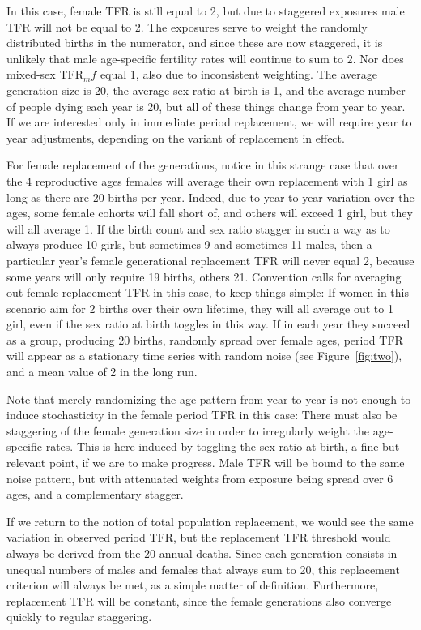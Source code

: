 \documentclass[reqno,12pt,oneside,a4paper]{report} %
\theoremstyle{plain}
\theoremstyle{definition}
\theoremstyle{remark}
\numberwithin{theorem}{chapter}     %
\begin{document}
In this case, female TFR is still equal to 2, but due to staggered exposures male TFR will not be equal to 2. The exposures serve to weight the randomly distributed births in the numerator, and since these are now staggered, it is unlikely that male age-specific fertility rates will continue to sum to 2. Nor does mixed-sex TFR$_mf$ equal 1, also due to inconsistent weighting. The average generation size is 20, the average sex ratio at birth is 1, and the average number of people dying each year is 20, but all of these things change from year to year. If we are interested only in immediate period replacement, we will require year to year adjustments, depending on the variant of replacement in effect.

For female replacement of the generations, notice in this strange case that over the 4 reproductive ages females will average their own replacement with 1 girl as long as there are 20 births per year. Indeed, due to year to year variation over the ages, some female cohorts will fall short of, and others will exceed 1 girl, but they will all average 1. If the birth count and sex ratio stagger in such a way as to always produce 10 girls, but sometimes 9 and sometimes 11 males, then a particular year's female generational replacement TFR will never equal 2, because some years will only require 19 births, others 21. Convention calls for averaging out female replacement TFR in this case, to keep things simple: If women in this scenario aim for 2 births over their own lifetime, they will all average out to 1 girl, even if the sex ratio at birth toggles in this way. If in each year they succeed as a group, producing 20 births, randomly spread over female ages, period TFR will appear as a stationary time series with random noise (see Figure~\ref{fig:two}), and a mean value of 2 in the long run. 

Note that merely randomizing the age pattern from year to year is not enough to induce stochasticity in the female period TFR in this case: There must also be staggering of the female generation size in order to irregularly weight the age-specific rates. This is here induced by toggling the sex ratio at birth, a fine but relevant point, if we are to make progress. Male TFR will be bound to the same noise pattern, but with attenuated weights from exposure being spread over 6 ages, and a complementary stagger.

If we return to the notion of total population replacement, we would see the same variation in observed period TFR, but the replacement TFR threshold would always be derived from the 20 annual deaths. Since each generation consists in unequal numbers of males and females that always sum to 20, this replacement criterion will always be met, as a simple matter of definition. Furthermore, replacement TFR will be constant, since the female generations also converge quickly to regular staggering.
\end{document}
